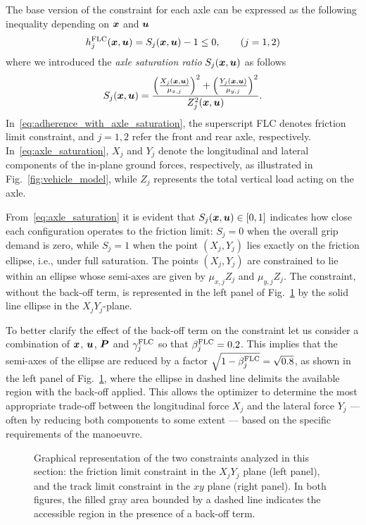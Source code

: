 The base version of the constraint for each axle can be expressed as the following inequality depending on $\boldsymbol{x}$ and $\boldsymbol{u}$
\begin{equation}
	h^\textrm{FLC}_j(\bx,\bu) =  S_j(\bx,\bu) - 1 \leq 0, \qquad{(j=1,2)}
\label{eq:adherence_with_axle_saturation}
\end{equation}
where we introduced the \emph{axle saturation ratio} $S_j(\boldsymbol{x},\boldsymbol{u})$ as follows
\begin{equation}
	S_j(\bx,\bu) = \frac{ \left( \frac{X_j(\bx,\bu)}{\mu_{x,j}} \right)^2+ \left( \frac{Y_j(\bx,\bu)}{\mu_{y,j}}\right)^2}{Z_j^2(\bx,\bu)}.
\label{eq:axle_saturation}
\end{equation}
In~\eqref{eq:adherence_with_axle_saturation}, the superscript FLC denotes friction limit constraint, and $j=1,2$ refer the front and rear axle, respectively. In~\eqref{eq:axle_saturation}, $X_j$ and $Y_j$ denote the longitudinal and lateral components of the in-plane ground forces, respectively, as illustrated in Fig.~\ref{fig:vehicle_model}, while $Z_j$ represents the total vertical load acting on the axle.

From~\eqref{eq:axle_saturation} it is evident that $S_j(\boldsymbol{x},\boldsymbol{u})\in [0,1]$ indicates how close each configuration operates to the friction limit: $S_j=0$ when the overall grip demand is zero, while $S_j = 1$ when the point $\left(X_j, Y_j\right)$ lies exactly on the friction ellipse, i.e., under full saturation.
The points $\left(X_j,Y_j\right)$ are constrained to lie within an ellipse whose semi-axes are given by $\mu_{x,j}Z_j$ and $\mu_{y,j}Z_j$. The constraint, without the back-off term, is represented in the left panel of Fig.~\ref{fig:robust_constraints} by the solid line ellipse in the $X_jY_j$-plane.

To better clarify the effect of the back-off term on the constraint let us consider a combination of $\boldsymbol{x}$, $\boldsymbol{u}$, $\boldsymbol{P}$ and $\gamma^\textrm{FLC}_j$ so that $\beta^\textrm{FLC}_j=0.2$. This implies that the semi-axes of the ellipse are reduced by a factor $\sqrt{1-\beta^\textrm{FLC}_j} = \sqrt{0.8}$, as shown in the left panel of Fig.~\ref{fig:robust_constraints}, where the ellipse in dashed line delimits the available region with the back-off applied. This allows the optimizer to determine the most appropriate trade-off between the longitudinal force $X_j$ and the lateral force $Y_j$ --- often by reducing both components to some extent --- based on the specific requirements of the manoeuvre.


\begin{figure}
	\centering
	\hfill
	\caption{Graphical representation of the two constraints analyzed in this section: the friction limit constraint in the $X_jY_j$ plane (left panel), and the track limit constraint in the $xy$ plane (right panel). In both figures, the filled gray area bounded by a dashed line indicates the accessible region in the presence of a back-off term.
	}
	\label{fig:robust_constraints}
\end{figure}

